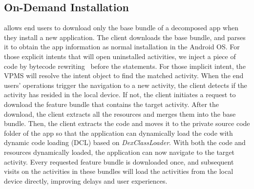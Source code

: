 \subsection{On-Demand Installation}
\nickName allows end users to download only the base bundle of a decomposed app when they install a new application. 
The \nickName{} client downloads the base bundle, and parses it to obtain the app information as normal installation in the Android OS.
For those explicit intents that will open uninstalled activities, we inject a piece of code by bytecode rewriting~\cite{OOPSLA2012Zhang} before the statements. For those implicit intent, the VPMS will resolve the intent object to find the matched activity. When the end users' operations trigger the navigation to a new activity, the \nickName{} client detects if the activity has resided in the local device. If not, the \nickName{} client initiates a request to download the feature bundle that contains the target activity. After the download, the \nickName{} client extracts all the resources and merges them into the base bundle. Then, the \nickName{} client extracts the code and moves it to the private source code folder of the app so that the application can dynamically load the code with dynamic code loading (DCL) based on \textit{DexClassLoader}.  With both the code and resources dynamically loaded, the application can now navigate to the target activity. Every requested feature bundle is downloaded once, and subsequent visits on the activities in these bundles will load the activities from the local device directly, improving delays and user experiences.
